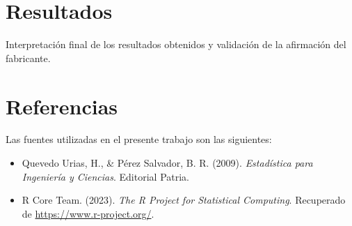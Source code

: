 \documentclass[a4paper,12pt]{article}
\begin{document}
\section{Resultados}
Interpretación final de los resultados obtenidos y validación de la afirmación del fabricante.

\section{Referencias}

Las fuentes utilizadas en el presente trabajo son las siguientes:

\begin{itemize}
    \item Quevedo Urias, H., \& Pérez Salvador, B. R. (2009). \textit{Estadística para Ingeniería y Ciencias}. Editorial Patria.
    \item R Core Team. (2023). \textit{The R Project for Statistical Computing}. Recuperado de \url{https://www.r-project.org/}.
\end{itemize}

\printbibliography
\end{document}
